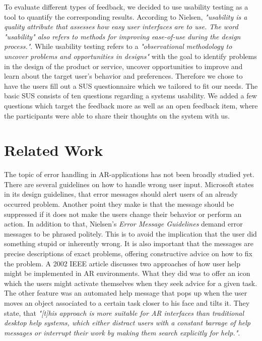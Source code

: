 \documentclass[11pt, a4paper]{article}
\begin{document}
		To evaluate different types of feedback, we decided to use usability testing as a tool to quantify the corresponding results. According to Nielsen, \textit{"usability is a quality attribute that assesses how easy user interfaces are to use. The word "usability" also refers to methods for improving ease-of-use during the design process."}\cite{Nielsen2012}. While usability testing refers to a \textit{"observational methodology to uncover problems and opportunities in designs"} with the goal to identify problems in the design of the product or service, uncover opportunities to improve and learn about the target user's behavior and preferences\cite{Moran2019}. Therefore we chose to have the users fill out a \ac{SUS} questionnaire which we tailored to fit our needs. The basic \ac{SUS} consists of ten questions regarding a systems usability. We added a few questions which target the feedback more as well as an open feedback item, where the participants were able to share their thoughts on the system with us. 
	\section*{Related Work}\label{sec:relatedwork}
		The topic of error handling in \ac{AR}-applications has not been broadly studied yet. There are several guidelines on how to handle wrong user input. Microsoft states in its design guidelines, that error messages should alert users of an already occurred problem. Another point they make is that the message should be suppressed if it does not make the users change their behavior or perform an action\cite{Microsoft}. In addition to that, Nielsen's \textit{Error Message Guidelines} demand error messages to be phrased politely. This is to avoid the implication that the user did something stupid or inherently wrong. It is also important that the messages are precise descriptions of exact problems, offering constructive advice on how to fix the problem\cite{Nielsen2001}. A 2002 IEEE article discusses two approaches of how user help might be implemented in \ac{AR} environments. What they did was to offer an icon which the users might activate themselves when they seek advice for a given task. The other feature was an automated help message that pops up when the user moves an object associated to a certain task closer to his face and tilts it. They state, that \textit{"\textnormal{[t]}his approach is more suitable for AR interfaces than traditional desktop help systems, which either distract users with a constant barrage of help messages or interrupt their work by making them search explicitly for help."}\cite{IEEE2002}.
\end{document}
